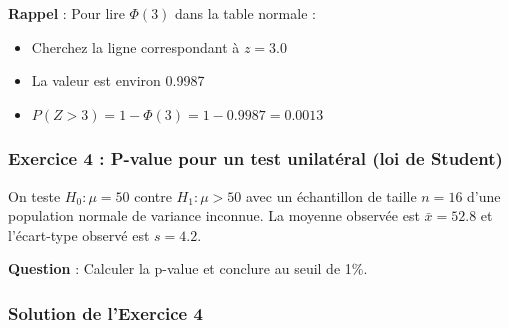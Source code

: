 \documentclass[11pt,a4paper]{article}
\begin{document}
\begin{rappelbox}
\textbf{Rappel} : Pour lire $\Phi(3)$ dans la table normale :
\begin{itemize}
    \item Cherchez la ligne correspondant à $z = 3.0$
    \item La valeur est environ 0.9987
    \item $P(Z > 3) = 1 - \Phi(3) = 1 - 0.9987 = 0.0013$
\end{itemize}
\end{rappelbox}

\newpage

\subsubsection{Exercice 4 : P-value pour un test unilatéral (loi de Student)}

On teste $H_0 : \mu = 50$ contre $H_1 : \mu > 50$ avec un échantillon de taille $n = 16$ d'une population normale de variance inconnue. La moyenne observée est $\bar{x} = 52.8$ et l'écart-type observé est $s = 4.2$.

\textbf{Question} : Calculer la p-value et conclure au seuil de 1\%.

\subsubsection*{Solution de l'Exercice 4}
\end{document}
